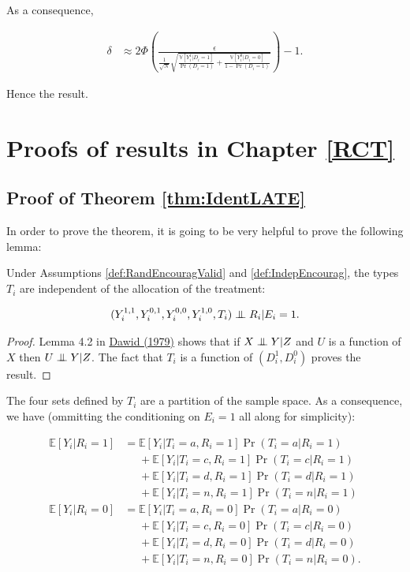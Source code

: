 \documentclass[]{book}
\newcommand{\esp}[1]{\mathbb{E}[ #1 ]}
\newcommand\Ind{\protect\mathpalette{\protect\independenT}{\perp}}
\def\independenT#1#2{\mathrel{\setbox0\hbox{$#1#2$}\copy0\kern-\wd0\mkern4mu\box0}}
\newcommand{\var}[1]{\mathbb{V}[ #1 ]}
\theoremstyle{definition}
\theoremstyle{definition}
\theoremstyle{definition}
\theoremstyle{remark}
\let\BeginKnitrBlock\begin \let\EndKnitrBlock\end
\begin{document}
As a consequence,

\begin{align*}
\delta & \approx 2\Phi\left(\frac{\epsilon}{\frac{1}{\sqrt{N}}\sqrt{\frac{\var{Y_i^1|D_i=1}}{\Pr(D_i=1)}+\frac{\var{Y_i^0|D_i=0}}{1-\Pr(D_i=1)}}}\right)-1.
\end{align*}

Hence the result.

\hypertarget{proofs-of-results-in-chapter-refrct}{%
\section{Proofs of results in Chapter \ref{RCT}}\label{proofs-of-results-in-chapter-refrct}}

\hypertarget{proofIdentLATE}{%
\subsection{Proof of Theorem \ref{thm:IdentLATE}}\label{proofIdentLATE}}

In order to prove the theorem, it is going to be very helpful to prove the following lemma:

\BeginKnitrBlock{lemma}[Unconfounded Types]
\protect\hypertarget{lem:UnconfTypes}{}{\label{lem:UnconfTypes} \iffalse (Unconfounded Types) \fi{} }Under Assumptions \ref{def:RandEncouragValid} and \ref{def:IndepEncourag}, the types \(T_i\) are independent of the allocation of the treatment:

\begin{align*}
(Y_i^{1,1},Y_i^{0,1},Y_i^{0,0},Y_i^{1,0},T_i)\Ind R_i|E_i=1.
\end{align*}
\EndKnitrBlock{lemma}

\BeginKnitrBlock{proof}
\iffalse{} {Proof. } \fi{}Lemma 4.2 in \href{https://www.jstor.org/stable/2984718}{Dawid (1979)} shows that if \(X\Ind Y|Z\) and \(U\) is a function of \(X\) then \(U\Ind Y|Z\).
The fact that \(T_i\) is a function of \((D_i^1,D^0_i)\) proves the result.
\EndKnitrBlock{proof}

The four sets defined by \(T_i\) are a partition of the sample space.
As a consequence, we have (ommitting the conditioning on \(E_i=1\) all along for simplicity):

\begin{align*}
\esp{Y_i|R_i=1} & = \esp{Y_i|T_i=a,R_i=1}\Pr(T_i=a|R_i=1)\\
                & \phantom{=}+ \esp{Y_i|T_i=c,R_i=1}\Pr(T_i=c|R_i=1) \\
                            & \phantom{=} + \esp{Y_i|T_i=d,R_i=1}\Pr(T_i=d|R_i=1)\\
                            & \phantom{=} + \esp{Y_i|T_i=n,R_i=1}\Pr(T_i=n|R_i=1)\\
\esp{Y_i|R_i=0} & = \esp{Y_i|T_i=a,R_i=0}\Pr(T_i=a|R_i=0)\\
                & \phantom{=} + \esp{Y_i|T_i=c,R_i=0}\Pr(T_i=c|R_i=0) \\
                            & \phantom{=} + \esp{Y_i|T_i=d,R_i=0}\Pr(T_i=d|R_i=0)\\
                            & \phantom{=}+ \esp{Y_i|T_i=n,R_i=0}\Pr(T_i=n|R_i=0).
\end{align*}
\end{document}
